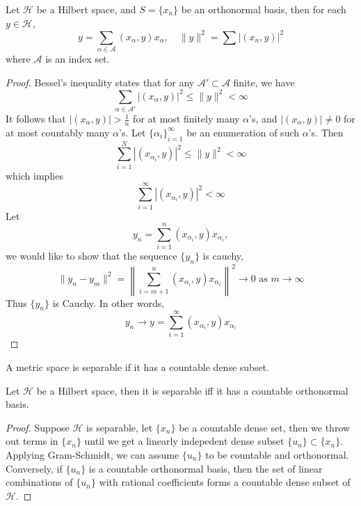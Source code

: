 \documentclass[openany]{book}
\begin{document}
\begin{prop}
    Let $\mathcal{H}$ be a Hilbert space, and $S=\{x_n\}$ be an orthonormal basis, then for each $y\in\mathcal{H}$, 
    \begin{equation*}
        y=\sum_{\alpha\in\mathcal{A}}(x_\alpha,y)x_\alpha, \quad \|y\|^2=\sum|(x_n,y)|^2
    \end{equation*}
    where $\mathcal{A}$ is an index set.
\end{prop}
\begin{proof}
    Bessel's inequality states that for any $\mathcal{A}'\subset\mathcal{A}$ finite, we have 
    \begin{equation*}
        \sum_{\alpha\in\mathcal{A}'}|(x_\alpha,y)|^2\leq\|y\|^2<\infty
    \end{equation*}
    It follows that $|(x_\alpha,y)|>\frac{1}{n}$ for at most finitely many $\alpha$'s, and $|(x_\alpha,y)|\neq 0$ for at most countably many $\alpha$'s. Let $\{\alpha_i\}_{i=1}^\infty$ be an enumeration of such $\alpha$'s. Then 
    \begin{equation*}
        \sum_{i=1}^N|(x_{\alpha_i},y)|^2\leq\|y\|^2<\infty
    \end{equation*}
    which implies 
    \begin{equation*}
        \sum_{i=1}^\infty|(x_{\alpha_i},y)|^2<\infty
    \end{equation*}
    Let 
    \begin{equation*}
        y_n=\sum_{i=1}^n(x_{\alpha_i},y)x_{\alpha_i}, 
    \end{equation*}
    we would like to show that the sequence $\{y_n\}$ is cauchy, 
    \begin{equation*}
        \|y_n-y_m\|^2=\left\|\sum_{i=m+1}^n(x_{\alpha_i}, y)x_{\alpha_i}\right\|^2\to 0 \text{ as } m\to\infty
    \end{equation*}
    Thus $\{y_n\}$ is Cauchy. In other words,
    \begin{equation*}
        y_n\to y=\sum_{i=1}^\infty (x_{\alpha_i},y)x_{\alpha_i}
    \end{equation*}
\end{proof}


\begin{defn}
    A metric space is separable if it has a countable dense subset.
\end{defn}

\begin{prop}[II.7]
    Let $\mathcal{H}$ be a Hilbert space, then it is separable iff it has a countable orthonormal basis.
\end{prop}
\begin{proof}
    Suppose $\mathcal{H}$ is separable, let $\{x_n\}$ be a countable dense set, then we throw out terms in $\{x_n\}$ until we get a linearly indepedent dense subset $\{u_n\}\subset \{x_n\}$. Applying Gram-Schmidt, we can assume $\{u_n\}$ to be countable and orthonormal. Conversely, if $\{u_n\}$ is a countable orthonormal basis, then the set of linear combinations of $\{u_n\}$ with rational coefficients forms a countable dense subset of $\mathcal{H}$.
\end{proof}
\end{document}
